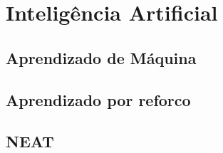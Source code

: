 \chapter{Intelig{\^e}ncia Artificial}

\lipsum[1-2]

\section{Aprendizado de M{\'a}quina}

\lipsum[3-4]

\section{Aprendizado por reforco}

\lipsum[4-5]

\section{NEAT}

\lipsum[6-8]
